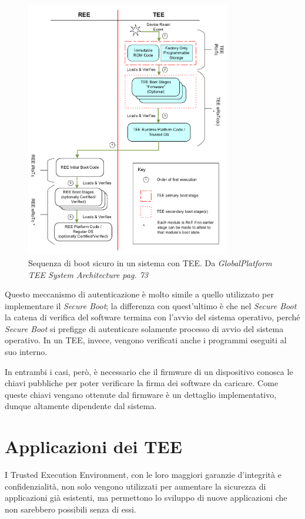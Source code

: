 \documentclass[12pt,italian]{report}
\begin{document}
\begin{figure}
\centering
\includegraphics[width=0.8\textwidth]{immagini/tee-boot-sequence}
\caption{
    Sequenza di boot sicuro in un sistema con TEE. 
    Da \textit{GlobalPlatform TEE System Architecture pag. 73}
    \cite{gp2020systemarchitecture}
}
\end{figure}

Questo meccanismo di autenticazione è molto simile a quello utilizzato per
implementare il \textit{Secure Boot}; la differenza con quest'ultimo è che
nel \textit{Secure Boot} la catena di verifica del software termina con
l'avvio del sistema operativo, perché \textit{Secure Boot} si prefigge
di autenticare solamente processo di avvio del sistema operativo.
In un TEE, invece, vengono verificati anche i programmi
eseguiti al suo interno.

In entrambi i casi, però, è necessario che il firmware di un dispositivo
conosca le chiavi pubbliche per poter verificare la firma dei software
da caricare. Come queste chiavi vengano ottenute dal firmware è un dettaglio
implementativo, dunque altamente dipendente dal sistema.

\section{Applicazioni dei TEE}
\label{sec:applicazioni-tee}
I Trusted Execution Environment, con le loro maggiori garanzie d'integrità
e confidenzialità, non solo vengono utilizzati per aumentare la sicurezza
di applicazioni già esistenti, ma permettono lo sviluppo di nuove
applicazioni che non sarebbero possibili senza di essi.
\end{document}
